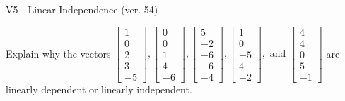 \begin{exercise}
  \begin{exerciseTitle}V5 - Linear Independence (ver. 54)\end{exerciseTitle}
  \begin{exerciseStatement}
    Explain why the vectors \(\left[\begin{array}{r}
1 \\
0 \\
2 \\
3 \\
-5
\end{array}\right] , \left[\begin{array}{r}
0 \\
0 \\
1 \\
4 \\
-6
\end{array}\right] , \left[\begin{array}{r}
5 \\
-2 \\
-6 \\
-6 \\
-4
\end{array}\right] , \left[\begin{array}{r}
1 \\
0 \\
-5 \\
4 \\
-2
\end{array}\right] , \text{ and } \left[\begin{array}{r}
4 \\
4 \\
0 \\
5 \\
-1
\end{array}\right]\) are linearly dependent or linearly independent.	



\end{exerciseStatement}
\end{exercise}
